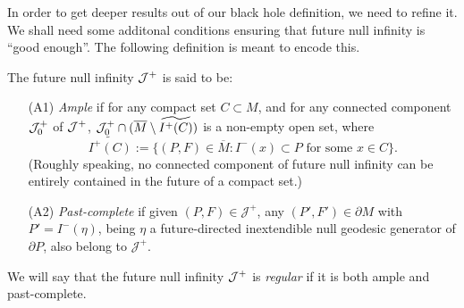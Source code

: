 In order to get deeper results out of our black hole definition, we need to refine it. We shall need some additonal conditions ensuring that future null infinity is ``good enough''. The following definition is meant to encode this.
\begin{definition}
\label{ample}
The future null infinity ${\cal J}^+$ is said to be:
\begin{itemize}
\item[(A1)] {\em Ample} if for any compact set $C \subset M$, and for any connected component ${\cal J}^+_0$ of ${\cal J}^+$,
${\cal J}^+_0\cap (\overline{M} \setminus \widetilde{I^+ (C)})$ is a non-empty open set, where
   \begin{equation}
\widetilde{I^+(C)}:=\{(P,F)\in \overline{M}: I^-(x)\subset P \mbox{ for some $x\in C$}\}.\label{eq:2}
\end{equation}
(Roughly speaking, no connected component of future null infinity can be entirely contained in the future of a compact set.)


\item[(A2)] \emph{Past-complete} if given $(P,F)\in \mathcal{J}^+$, any $(P',F')\in\partial M$ with $P'=I^-(\eta)$, being $\eta$ a future-directed inextendible null geodesic generator of $\partial P$, also belong to $\mathcal{J}^+$.


\end{itemize}
We will say that the future null infinity ${\cal J}^+$ is \emph{regular} if it is both ample and past-complete.
\end{definition}

